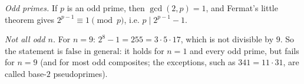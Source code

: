 \emph{Odd primes.} If $p$ is an odd prime, then $\gcd(2,p)=1$, and Fermat's little theorem gives $2^{p-1}\equiv1\pmod p$, i.e. $p\mid2^{p-1}-1$.

\emph{Not all odd $n$.} For $n=9$: $2^8-1=255=3\cdot5\cdot17$, which is not divisible by $9$. So the statement is $\boxed{\text{false in general}}$: it holds for $n=1$ and every odd prime, but fails for $n=9$ (and for most odd composites; the exceptions, such as $341=11\cdot31$, are called base-$2$ pseudoprimes).
